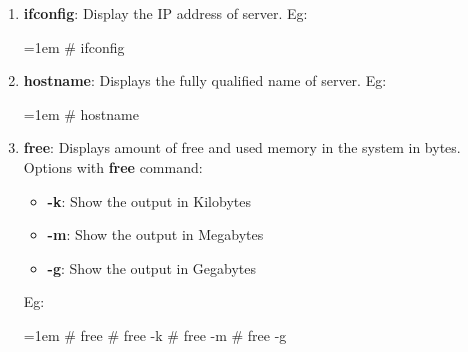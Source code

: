 \begin{flushleft}
\begin{enumerate}
\begin{itemize}
			\end{itemize}

	\newpage
		\item \textbf{ifconfig}: Display the IP address of server.
		\newline
		Eg:
		\begin{tcolorbox}[breakable,notitle,boxrule=1pt,colback=black,colframe=black]
			\color{green}
			\font=1em
			\# ifconfig
			\font=4pt
		\end{tcolorbox}
			\bigskip
			\bigskip		
		\newpage
		\item \textbf{hostname}: Displays the fully qualified name of server.
		\newline
		Eg:
		\begin{tcolorbox}[breakable,notitle,boxrule=1pt,colback=black,colframe=black]
			\color{green}
			\font=1em
			\# hostname
			\font=4pt
		\end{tcolorbox}
		\bigskip
		\bigskip
		
		\item \textbf{free}: Displays amount of free and used memory in the system in bytes.
		\newline
			Options with \textbf{free} command:
			\begin{itemize}
				\item \textbf{-k}: Show the output in Kilobytes
				\item \textbf{-m}: Show the output in Megabytes
				\item \textbf{-g}: Show the output in Gegabytes
			\end{itemize}
		Eg:
		\begin{tcolorbox}[breakable,notitle,boxrule=1pt,colback=black,colframe=black]
			\color{green}
			\font=1em
			\# free 
			\newline
			\# free -k
			\newline
			\# free -m
			\newline
			\# free -g
			\font=4pt
		\end{tcolorbox}
		

\end{enumerate}
\end{flushleft}
